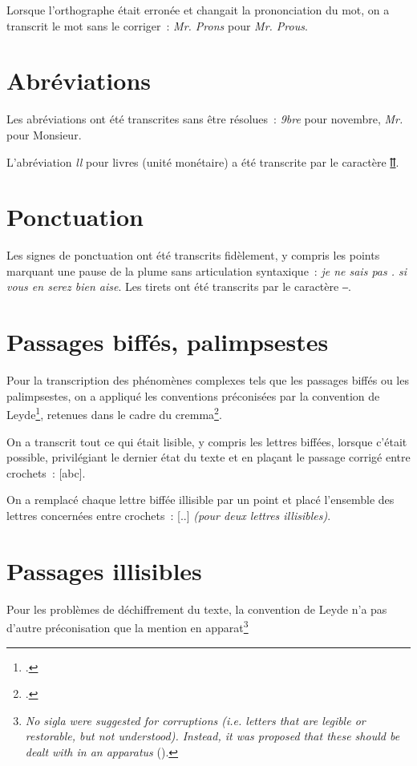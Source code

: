 \documentclass[a4paper,12pt,twoside]{book}
\newcommand{\langue}[1]{\emph{#1}}
\begin{document}
			Lorsque l'orthographe était erronée et changait la prononciation du mot, on a transcrit le mot sans le corriger~: \textit{Mr. Prons} pour \textit{Mr. Prous}.
		
		\section{Abréviations}
			Les abréviations ont été transcrites sans être résolues~: \textit{9bre} pour novembre, \textit{Mr.} pour Monsieur.
		
			L'abréviation \textit{ll} pour livres (unité monétaire) a été transcrite par le caractère \href{https://mufi.info/m.php?p=muficharinfo&i=4088}{ỻ}.

		\section{Ponctuation}
			Les signes de ponctuation ont été transcrits fidèlement, y compris les points marquant une pause de la plume sans articulation syntaxique~: \textit{je ne sais pas . si vous en serez bien aise}. Les tirets ont été transcrits par le caractère ‒.
		
		\section{Passages biffés, palimpsestes}
			Pour la transcription des phénomènes complexes tels que les passages biffés ou les palimpsestes, on a appliqué les conventions préconisées par la convention de Leyde\footcite{leidenConvention}, retenues dans le cadre du \gls{cremma}\footcite{pincheSeminaireCreationModele2021a}.
			
			On a transcrit tout ce qui était lisible, y compris les lettres biffées, lorsque c'était possible, privilégiant le dernier état du texte et en plaçant le passage corrigé entre crochets~: [abc].
		
			On a remplacé chaque lettre biffée illisible par un point et placé l'ensemble des lettres concernées entre crochets~: [..] \textit{(pour deux lettres illisibles)}.
		
		\section{Passages illisibles}
			Pour les problèmes de déchiffrement du texte, la convention de Leyde n'a pas d'autre préconisation que la mention en apparat\footnote{\langue{No sigla were suggested for corruptions (i.e. letters that are legible or restorable, but not understood). Instead, it was proposed that these should be dealt with in an apparatus} (\cite{leidenConvention}).}
           	
	\printbibheading[heading=bibintoc]%
	\printbibliography[heading=subbibliography, title=Scripts, keyword=scripts]
\end{document}
